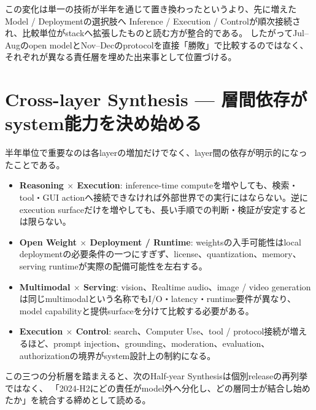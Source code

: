 この変化は単一の技術が半年を通じて置き換わったというより、先に増えたModel / Deploymentの選択肢へ
Inference / Execution / Controlが順次接続され、比較単位がstackへ拡張したものと読む方が整合的である。
したがってJul--Augのopen modelとNov--Decのprotocolを直接「勝敗」で比較するのではなく、
それぞれが異なる責任層を埋めた出来事として位置づける。
\autocite{src-9cf289b414fd,src-3278a129a17e}

\section{Cross-layer Synthesis — 層間依存がsystem能力を決め始める}
半年単位で重要なのは各layerの増加だけでなく、layer間の依存が明示的になったことである。

\begin{itemize}[leftmargin=1.5em,itemsep=0.45em]
\item \textbf{Reasoning $\times$ Execution}: inference-time computeを増やしても、検索・tool・GUI actionへ接続できなければ外部世界での実行にはならない。逆にexecution surfaceだけを増やしても、長い手順での判断・検証が安定するとは限らない。
\item \textbf{Open Weight $\times$ Deployment / Runtime}: weightsの入手可能性はlocal deploymentの必要条件の一つにすぎず、license、quantization、memory、serving runtimeが実際の配備可能性を左右する。
\item \textbf{Multimodal $\times$ Serving}: vision、Realtime audio、image / video generationは同じmultimodalという名称でもI/O・latency・runtime要件が異なり、model capabilityと提供surfaceを分けて比較する必要がある。
\item \textbf{Execution $\times$ Control}: search、Computer Use、tool / protocol接続が増えるほど、prompt injection、grounding、moderation、evaluation、authorizationの境界がsystem設計上の制約になる。
\end{itemize}
\autocite{src-3278a129a17e,src-9cf289b414fd}

この三つの分析層を踏まえると、次のHalf-year Synthesisは個別releaseの再列挙ではなく、
「2024-H2にどの責任がmodel外へ分化し、どの層同士が結合し始めたか」を統合する締めとして読める。
